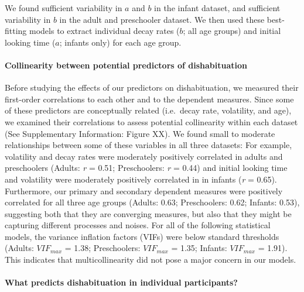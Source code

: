 \documentclass[10pt, letterpaper]{article}
\begin{document}
We found sufficient variability in \(a\) and \(b\) in the infant
dataset, and sufficient variability in \(b\) in the adult and
preschooler dataset. We then used these best-fitting models to extract
individual decay rates (\(b\); all age groups) and initial looking time
(\(a\); infants only) for each age group.

\hypertarget{collinearity-between-potential-predictors-of-dishabituation}{%
\paragraph{Collinearity between potential predictors of
dishabituation}\label{collinearity-between-potential-predictors-of-dishabituation}}

Before studying the effects of our predictors on dishabituation, we
measured their first-order correlations to each other and to the
dependent measures. Since some of these predictors are conceptually
related (i.e.~decay rate, volatility, and age), we examined their
correlations to assess potential collinearity within each dataset (See
Supplementary Information: Figure XX). We found small to moderate
relationships between some of these variables in all three datasets: For
example, volatility and decay rates were moderately positively
correlated in adults and preschoolers (Adults: \emph{r} = 0.51;
Preschoolers: \emph{r} = 0.44) and initial looking time and volatility
were moderately positively correlated in in infants (\emph{r} = 0.65).
Furthermore, our primary and secondary dependent measures were
positively correlated for all three age groups (Adults: 0.63;
Preschoolers: 0.62; Infants: 0.53), suggesting both that they are
converging measures, but also that they might be capturing different
processes and noises. For all of the following statistical models, the
variance inflation factors (VIFs) were below standard thresholds
(Adults: \(VIF_{max}\) = 1.38; Preschoolers: \(VIF_{max}\) = 1.35;
Infants: \(VIF_{max}\) = 1.91). This indicates that multicollinearity
did not pose a major concern in our models.

\hypertarget{what-predicts-dishabituation-in-individual-participants}{%
\paragraph{What predicts dishabituation in individual
participants?}\label{what-predicts-dishabituation-in-individual-participants}}
\end{document}
